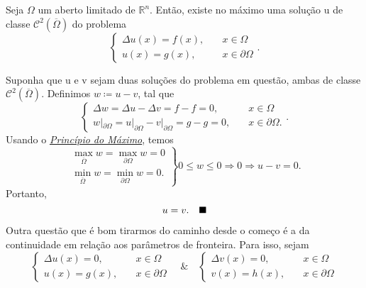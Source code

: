 \documentclass[../pde_notes.tex]{subfiles}
\begin{document}
\begin{theorem*}
	Seja \(\Omega \) um aberto limitado de \(\mathbb{R}^{n}\). Então, existe no máximo uma solução u de classe \(\mathcal{C}^{2}(\overline{\Omega })\) do problema
	\[
		\left\{\begin{array}{ll}
			\Delta u (x)=f(x), & \quad x\in \Omega          \\
			u(x)=g(x),         & \quad x\in \partial \Omega
		\end{array}\right..
	\]
\end{theorem*}
\begin{proof*}
	Suponha que u e v sejam duas soluções do problema em questão, ambas de classe \(\mathcal{C}^{2}(\overline{\Omega })\). Definimos \(w\coloneqq u-v\), tal que
	\[
		\left\{\begin{array}{ll}
			\Delta w = \Delta u - \Delta v = f - f =0,                                 & \quad  x\in \Omega           \\
			w|_{\partial \Omega } = u|_{\partial \Omega }-v|_{\partial \Omega }=g-g=0, & \quad x\in \partial \Omega .
		\end{array}\right..
	\]
	Usando o \hyperlink{maximum_principle}{\textit{Princípio do Máximo}}, temos
	\[
		\left.\begin{array}{ll}
			\max_{\overline{\Omega }} w = \max_{\partial \Omega }w = 0 \\
			\min_{\overline{\Omega }} w = \min_{\partial \Omega }w = 0.
		\end{array}\right\} 0\leq w\leq 0  \Rightarrow 0 \Rightarrow u-v = 0.
	\]
	Portanto,
	\[
		u = v. \quad \text{$\blacksquare$}
	\]
\end{proof*}

Outra questão que é bom tirarmos do caminho desde o começo é a da continuidade em relação aos parâmetros de fronteira. Para isso, sejam
\[
	\left\{\begin{array}{ll}
		\Delta u(x) = 0, & \quad x\in \Omega          \\
		u(x) = g(x),     & \quad x\in \partial \Omega
	\end{array}\right. \quad\&\quad \left\{\begin{array}{ll}
		\Delta v(x) = 0, & \quad x\in \Omega          \\
		v(x) = h(x),     & \quad x\in \partial \Omega
	\end{array}\right.
\]
\end{document}

